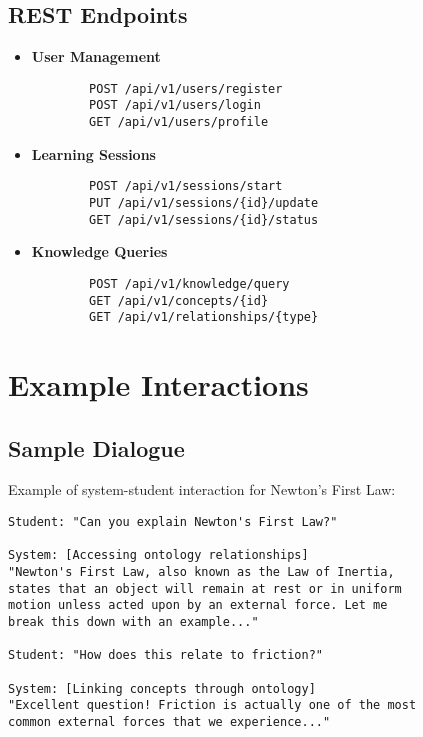 \subsection{REST Endpoints}
\begin{itemize}
    \item \textbf{User Management}
        \begin{verbatim}
        POST /api/v1/users/register
        POST /api/v1/users/login
        GET /api/v1/users/profile
        \end{verbatim}
    
    \item \textbf{Learning Sessions}
        \begin{verbatim}
        POST /api/v1/sessions/start
        PUT /api/v1/sessions/{id}/update
        GET /api/v1/sessions/{id}/status
        \end{verbatim}
    
    \item \textbf{Knowledge Queries}
        \begin{verbatim}
        POST /api/v1/knowledge/query
        GET /api/v1/concepts/{id}
        GET /api/v1/relationships/{type}
        \end{verbatim}
\end{itemize}

\section{Example Interactions}
\label{sec:example-interactions}

\subsection{Sample Dialogue}
Example of system-student interaction for Newton's First Law:

\begin{verbatim}
Student: "Can you explain Newton's First Law?"

System: [Accessing ontology relationships]
"Newton's First Law, also known as the Law of Inertia, 
states that an object will remain at rest or in uniform 
motion unless acted upon by an external force. Let me 
break this down with an example..."

Student: "How does this relate to friction?"

System: [Linking concepts through ontology]
"Excellent question! Friction is actually one of the most 
common external forces that we experience..."
\end{verbatim}

